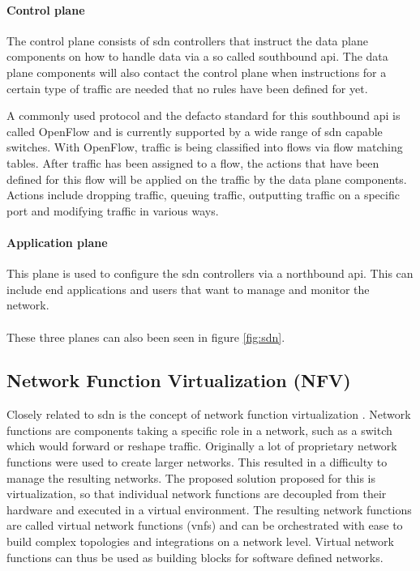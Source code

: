 \paragraph{Control plane} The control plane consists of \acrshort{sdn} controllers that instruct the data plane components on how to handle data via a so called southbound \acrshort{api}. The data plane components will also contact the control plane when instructions for a certain type of traffic are needed that no rules have been defined for yet.

A commonly used protocol and the defacto standard for this southbound \acrshort{api} is called OpenFlow \cite{openflow} and is currently supported by a wide range of \acrshort{sdn} capable switches. With OpenFlow, traffic is being classified into flows via flow matching tables. After traffic has been assigned to a flow, the actions that have been defined for this flow will be applied on the traffic by the data plane components. Actions include dropping traffic, queuing traffic, outputting traffic on a specific port and modifying traffic in various ways.

\paragraph{Application plane} This plane is used to configure the \acrshort{sdn} controllers via a northbound \acrshort{api}. This can include end applications and users that want to manage and monitor the network.

\paragraph{}These three planes can also been seen in figure \ref{fig:sdn}.

\subsection{Network Function Virtualization (NFV)}
Closely related to \acrshort{sdn} is the concept of network function virtualization \cite{nfv}. Network functions are components taking a specific role in a network, such as a switch which would forward or reshape traffic. Originally a lot of proprietary network functions were used to create larger networks. This resulted in a difficulty to manage the resulting networks. The proposed solution proposed for this is virtualization, so that individual network functions are decoupled from their hardware and executed in a virtual environment. The resulting network functions are called virtual network functions (\acrshort{vnf}s) and can be orchestrated with ease to build complex topologies and integrations on a network level. Virtual network functions can thus be used as building blocks for software defined networks.


